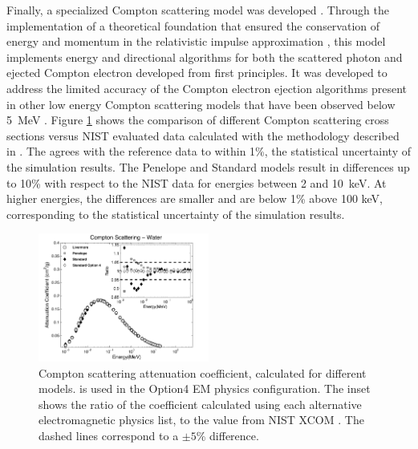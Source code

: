 Finally, a specialized Compton scattering model 
 was 
developed \cite{embib:gamma13,embib:gamma14}.  Through the implementation of a
theoretical foundation that ensured the conservation of energy and momentum in
the relativistic impulse approximation \cite{embib:gamma15}, this model
implements energy and directional algorithms for both the scattered photon and 
ejected Compton electron developed from first principles. It was developed to 
address the limited accuracy of the Compton electron ejection algorithms present
in other low energy Compton scattering models that have been observed below
5~MeV \cite{embib:gamma14,embib:gamma7,embib:gamma8}. Figure \ref{em:compton} 
shows the comparison of different \Gfour{} Compton scattering cross sections
versus NIST evaluated data \cite{embib:gamma16} calculated with the methodology 
described in \cite{embib:gamma17}.  The  agrees with
the reference data to within
1\%, the statistical uncertainty of the simulation results.  The Penelope and 
Standard models result in differences up to 10\% with respect to the NIST data
for energies between 2 and 10~keV.  At higher energies, the differences are 
smaller and are below 1\% above 100 keV, corresponding to the statistical 
uncertainty of the simulation results.
\begin{figure}
\includegraphics[width=0.5\textwidth]{figures/plot_compton.pdf}
\caption{Compton scattering attenuation coefficient, calculated for different
         \Gfour{} models.  is used in the Option4
         EM physics configuration.  The inset shows the ratio of the coefficient
         calculated using each alternative \Gfour{} electromagnetic physics list,
         to the value from NIST XCOM \cite{embib:gamma16}.  The
         dashed lines correspond to a $\pm 5$\% difference.}
\label{em:compton}
\end{figure}

